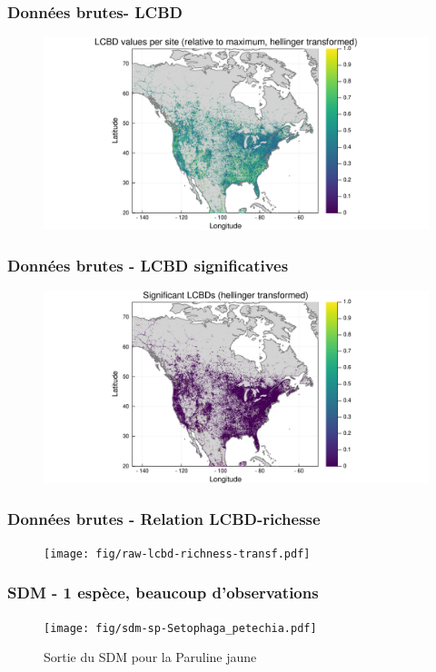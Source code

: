 \documentclass[10pt]{beamer}
\begin{document}
\begin{frame}
  \frametitle{Données brutes- LCBD}
  \begin{figure}
    \centering
    \includegraphics[scale=0.4]{fig/raw-lcbd-transf.pdf}
  \end{figure}
\end{frame}

\begin{frame}
  \frametitle{Données brutes - LCBD significatives}
  \begin{figure}
    \centering
    \includegraphics[scale=0.4]{fig/raw-lcbd-signif.pdf}
  \end{figure}
\end{frame}

\begin{frame}
  \frametitle{Données brutes - Relation LCBD-richesse}
  \begin{figure}
    \centering
    \texttt{[image: fig/raw-lcbd-richness-transf.pdf]}
  \end{figure}
\end{frame}


\begin{frame}
  \frametitle{SDM - 1 espèce, beaucoup d'observations}
  \begin{figure}
    \centering
    \texttt{[image: fig/sdm-sp-Setophaga\_petechia.pdf]}
    \caption{Sortie du SDM pour la Paruline jaune}
  \end{figure}
\end{frame}
\end{document}
